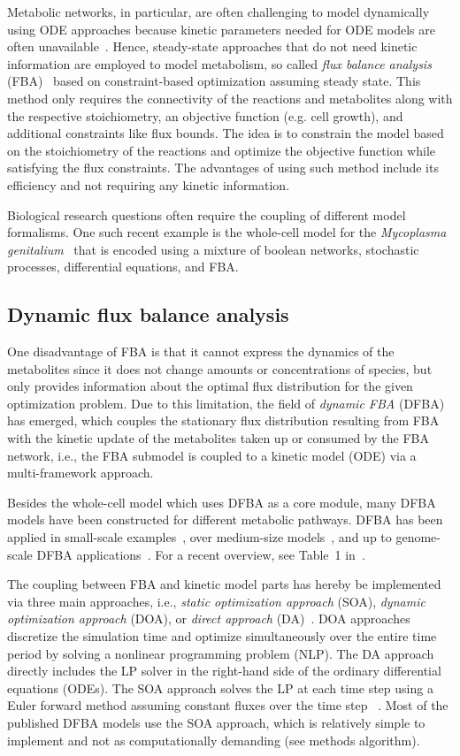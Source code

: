 \documentclass{bioinfo}
\begin{document}
Metabolic networks, in particular, are often challenging to model dynamically using ODE approaches because kinetic parameters needed for ODE models are often unavailable~\citep{DFBA}. Hence, steady-state approaches that do not need kinetic information are employed to model metabolism, so called \emph{flux balance analysis} (FBA)~\citep{FBA0,FBA1} based on constraint-based optimization assuming steady state. This method only requires the connectivity of the reactions and metabolites along with the respective stoichiometry, an objective function (e.g. cell growth), and additional constraints like flux bounds. The idea is to constrain the model based on the stoichiometry of the reactions and optimize the objective function while satisfying the flux constraints. The advantages of using such method include its efficiency and not requiring any kinetic information.

Biological research questions often require the coupling of different model formalisms. One such recent example is the whole-cell model for the \emph{Mycoplasma genitalium}~\citep{WHOLECELL} that is encoded using a mixture of boolean networks, stochastic processes, differential equations, and FBA.  

\subsection{Dynamic flux balance analysis}
One disadvantage of FBA is that it cannot express the dynamics of the metabolites since it does not change amounts or concentrations of species, but only provides information about the optimal flux distribution for the given optimization problem. Due to this limitation, the field of \emph{dynamic FBA} (DFBA)~\citep{DFBA} has emerged, which couples the stationary flux distribution resulting from FBA with the kinetic update of the metabolites taken up or consumed by the FBA network, i.e., the FBA submodel is coupled to a kinetic model (ODE) via a multi-framework approach. 

Besides the whole-cell model which uses DFBA as a core module, many DFBA models have been constructed for different metabolic pathways. DFBA has been applied in small-scale examples~\citep{DFBA,DFBA_ECOLI,LUO2006}, over medium-size models~\citep{pizarro2007,lequeux2010,meadows2010}, and up to genome-scale DFBA applications~\citep{hanly2012,hjersted2007}. For a recent overview, see Table~1 in~\citep{hoffner2013}.

The coupling between FBA and kinetic model parts has hereby be implemented via three main approaches, i.e., \emph{static optimization approach} (SOA), \emph{dynamic optimization approach} (DOA), or \emph{direct approach} (DA)~\citep{Gomez2014}. DOA approaches discretize the simulation time and optimize simultaneously over the entire time period by
solving a nonlinear programming problem (NLP). The DA approach directly includes the LP solver in the right-hand side of the ordinary differential equations (ODEs). The SOA approach solves the LP at each time step using a Euler forward method assuming constant fluxes over the time step ~\citep{Gomez2014}. Most of the published DFBA models use the SOA approach, which is relatively simple to implement and not as computationally demanding (see methods algorithm).
\end{document}

